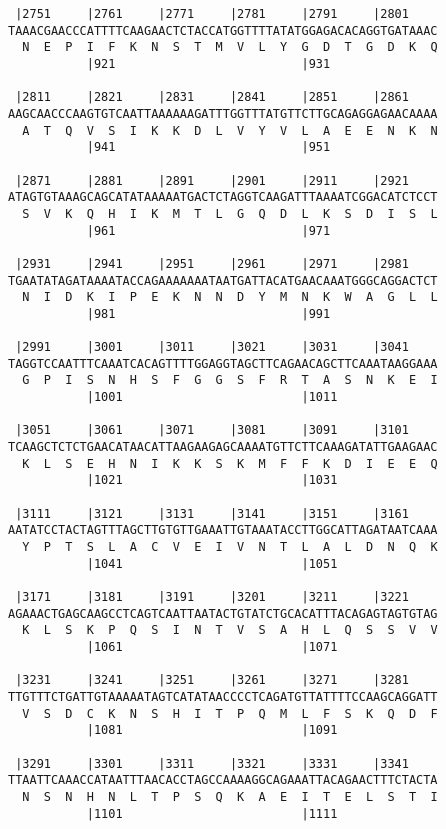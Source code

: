 \documentclass{article}
\begin{document}
\begin{Verbatim}
 |2751     |2761     |2771     |2781     |2791     |2801    
TAAACGAACCCATTTTCAAGAACTCTACCATGGTTTTATATGGAGACACAGGTGATAAAC
  N  E  P  I  F  K  N  S  T  M  V  L  Y  G  D  T  G  D  K  Q
           |921                          |931               
  
 |2811     |2821     |2831     |2841     |2851     |2861    
AAGCAACCCAAGTGTCAATTAAAAAAGATTTGGTTTATGTTCTTGCAGAGGAGAACAAAA
  A  T  Q  V  S  I  K  K  D  L  V  Y  V  L  A  E  E  N  K  N
           |941                          |951               
  
 |2871     |2881     |2891     |2901     |2911     |2921    
ATAGTGTAAAGCAGCATATAAAAATGACTCTAGGTCAAGATTTAAAATCGGACATCTCCT
  S  V  K  Q  H  I  K  M  T  L  G  Q  D  L  K  S  D  I  S  L
           |961                          |971               
  
 |2931     |2941     |2951     |2961     |2971     |2981    
TGAATATAGATAAAATACCAGAAAAAAATAATGATTACATGAACAAATGGGCAGGACTCT
  N  I  D  K  I  P  E  K  N  N  D  Y  M  N  K  W  A  G  L  L
           |981                          |991               
  
 |2991     |3001     |3011     |3021     |3031     |3041    
TAGGTCCAATTTCAAATCACAGTTTTGGAGGTAGCTTCAGAACAGCTTCAAATAAGGAAA
  G  P  I  S  N  H  S  F  G  G  S  F  R  T  A  S  N  K  E  I
           |1001                         |1011              
  
 |3051     |3061     |3071     |3081     |3091     |3101    
TCAAGCTCTCTGAACATAACATTAAGAAGAGCAAAATGTTCTTCAAAGATATTGAAGAAC
  K  L  S  E  H  N  I  K  K  S  K  M  F  F  K  D  I  E  E  Q
           |1021                         |1031              
  
 |3111     |3121     |3131     |3141     |3151     |3161    
AATATCCTACTAGTTTAGCTTGTGTTGAAATTGTAAATACCTTGGCATTAGATAATCAAA
  Y  P  T  S  L  A  C  V  E  I  V  N  T  L  A  L  D  N  Q  K
           |1041                         |1051              
  
 |3171     |3181     |3191     |3201     |3211     |3221    
AGAAACTGAGCAAGCCTCAGTCAATTAATACTGTATCTGCACATTTACAGAGTAGTGTAG
  K  L  S  K  P  Q  S  I  N  T  V  S  A  H  L  Q  S  S  V  V
           |1061                         |1071              
  
 |3231     |3241     |3251     |3261     |3271     |3281    
TTGTTTCTGATTGTAAAAATAGTCATATAACCCCTCAGATGTTATTTTCCAAGCAGGATT
  V  S  D  C  K  N  S  H  I  T  P  Q  M  L  F  S  K  Q  D  F
           |1081                         |1091              
  
 |3291     |3301     |3311     |3321     |3331     |3341    
TTAATTCAAACCATAATTTAACACCTAGCCAAAAGGCAGAAATTACAGAACTTTCTACTA
  N  S  N  H  N  L  T  P  S  Q  K  A  E  I  T  E  L  S  T  I
           |1101                         |1111              
  

\end{Verbatim}
\end{document}
